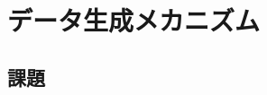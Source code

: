 \documentclass{ltjsbook}
\begin{document}
 
\chapter{データ生成メカニズム}
\label{chapter18} 


\section{課題}
\end{document}

